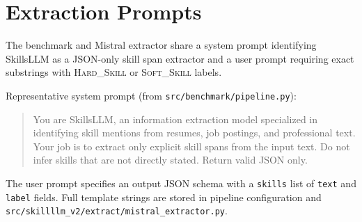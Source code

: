 \chapter{Extraction Prompts}
\label{app:prompts}

The benchmark and Mistral extractor share a system prompt identifying SkillsLLM as a JSON-only skill span extractor and a user prompt requiring exact substrings with \textsc{Hard\_Skill} or \textsc{Soft\_Skill} labels.

Representative system prompt (from \texttt{src/benchmark/pipeline.py}):

\begin{quote}\small
You are SkillsLLM, an information extraction model specialized in identifying skill mentions from resumes, job postings, and professional text. Your job is to extract only explicit skill spans from the input text. Do not infer skills that are not directly stated. Return valid JSON only.
\end{quote}

The user prompt specifies an output JSON schema with a \texttt{skills} list of \texttt{text} and \texttt{label} fields.
Full template strings are stored in pipeline configuration and \texttt{src/skillllm\_v2/extract/mistral\_extractor.py}.
